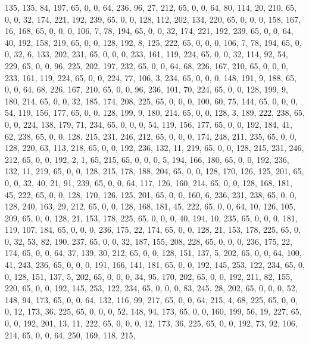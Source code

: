 \begin{DoxyCode}
       135, 135, 84, 197, 65, 0, 0, 64, 236, 96, 27, 212, 65, 0, 0, 64, 80, 114, 20, 210, 65, 0, 0, 32, 174, 221,
       192, 239, 65, 0, 0, 128, 112, 202, 134, 220, 65, 0, 0, 0, 158, 167, 16, 168, 65, 0, 0, 0, 106, 7, 78, 194,
       65, 0, 0, 32, 174, 221, 192, 239, 65, 0, 0, 64, 40, 192, 158, 219, 65, 0, 0, 128, 192, 8, 125, 222, 65, 0, 0,
       0, 106, 7, 78, 194, 65, 0, 0, 32, 6, 133, 202, 231, 65, 0, 0, 0, 233, 161, 119, 224, 65, 0, 0, 32, 114, 92,
       54, 229, 65, 0, 0, 96, 225, 202, 197, 232, 65, 0, 0, 64, 68, 226, 167, 210, 65, 0, 0, 0, 233, 161, 119,
       224, 65, 0, 0, 224, 77, 106, 3, 234, 65, 0, 0, 0, 148, 191, 9, 188, 65, 0, 0, 64, 68, 226, 167, 210, 65, 0, 0,
       96, 236, 101, 70, 224, 65, 0, 0, 128, 199, 9, 180, 214, 65, 0, 0, 32, 185, 174, 208, 225, 65, 0, 0, 0, 100,
       60, 75, 144, 65, 0, 0, 0, 54, 119, 156, 177, 65, 0, 0, 128, 199, 9, 180, 214, 65, 0, 0, 128, 3, 189, 222,
       238, 65, 0, 0, 224, 138, 179, 71, 234, 65, 0, 0, 0, 54, 119, 156, 177, 65, 0, 0, 192, 184, 41, 62, 238, 65, 0,
       0, 128, 215, 231, 246, 212, 65, 0, 0, 0, 174, 248, 211, 235, 65, 0, 0, 128, 220, 63, 113, 218, 65, 0, 0,
       192, 236, 132, 11, 219, 65, 0, 0, 128, 215, 231, 246, 212, 65, 0, 0, 192, 2, 1, 65, 215, 65, 0, 0, 0, 5, 194,
       166, 180, 65, 0, 0, 192, 236, 132, 11, 219, 65, 0, 0, 128, 215, 178, 188, 204, 65, 0, 0, 128, 170, 126, 125,
       201, 65, 0, 0, 32, 40, 21, 91, 239, 65, 0, 0, 64, 117, 126, 160, 214, 65, 0, 0, 128, 168, 181, 45, 222, 65,
       0, 0, 128, 170, 126, 125, 201, 65, 0, 0, 160, 6, 236, 231, 238, 65, 0, 0, 128, 240, 163, 29, 212, 65, 0, 0,
       128, 168, 181, 45, 222, 65, 0, 0, 64, 10, 126, 105, 209, 65, 0, 0, 128, 21, 153, 178, 225, 65, 0, 0, 0, 40,
       194, 10, 235, 65, 0, 0, 0, 181, 119, 107, 184, 65, 0, 0, 0, 236, 175, 22, 174, 65, 0, 0, 128, 21, 153, 178,
       225, 65, 0, 0, 32, 53, 82, 190, 237, 65, 0, 0, 32, 187, 155, 208, 228, 65, 0, 0, 0, 236, 175, 22, 174, 65,
       0, 0, 64, 37, 139, 30, 212, 65, 0, 0, 128, 151, 137, 5, 202, 65, 0, 0, 64, 100, 41, 243, 236, 65, 0, 0, 0,
       191, 166, 141, 181, 65, 0, 0, 192, 145, 253, 122, 234, 65, 0, 0, 128, 151, 137, 5, 202, 65, 0, 0, 0, 34, 95,
       170, 202, 65, 0, 0, 192, 211, 82, 155, 220, 65, 0, 0, 192, 145, 253, 122, 234, 65, 0, 0, 0, 83, 245, 28,
       202, 65, 0, 0, 0, 52, 148, 94, 173, 65, 0, 0, 64, 132, 116, 99, 217, 65, 0, 0, 64, 215, 4, 68, 225, 65, 0, 0,
       0, 12, 173, 36, 225, 65, 0, 0, 0, 52, 148, 94, 173, 65, 0, 0, 160, 199, 56, 19, 227, 65, 0, 0, 192, 201, 13,
       11, 222, 65, 0, 0, 0, 12, 173, 36, 225, 65, 0, 0, 192, 73, 92, 106, 214, 65, 0, 0, 64, 250, 169, 118, 215,

\end{DoxyCode}
